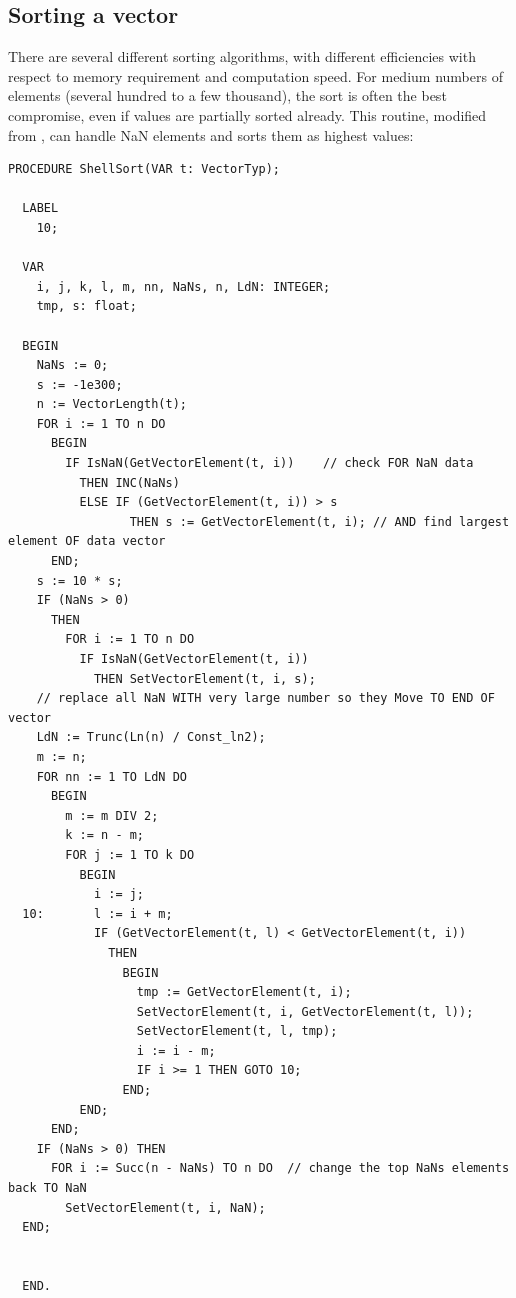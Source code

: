 \begin{refsection}
\section{Sorting a vector}\label{text:sort}

There are several different sorting algorithms, with different efficiencies with respect to memory requirement and computation speed. For medium numbers of elements (several hundred to a few thousand), the  sort is often the best compromise, even if values are partially sorted already. This routine, modified from \parencite{Mor-13}, can handle \acs{NaN} elements and sorts them as highest values:
\begin{lstlisting}[caption=Shell sort]
  PROCEDURE ShellSort(VAR t: VectorTyp);

  LABEL
    10;

  VAR
    i, j, k, l, m, nn, NaNs, n, LdN: INTEGER;
    tmp, s: float;

  BEGIN
    NaNs := 0;
    s := -1e300;
    n := VectorLength(t);
    FOR i := 1 TO n DO
      BEGIN
        IF IsNaN(GetVectorElement(t, i))    // check FOR NaN data
          THEN INC(NaNs)
          ELSE IF (GetVectorElement(t, i)) > s
                 THEN s := GetVectorElement(t, i); // AND find largest element OF data vector
      END;
    s := 10 * s;
    IF (NaNs > 0)
      THEN
        FOR i := 1 TO n DO
          IF IsNaN(GetVectorElement(t, i))
            THEN SetVectorElement(t, i, s);
    // replace all NaN WITH very large number so they Move TO END OF vector
    LdN := Trunc(Ln(n) / Const_ln2);
    m := n;
    FOR nn := 1 TO LdN DO
      BEGIN
        m := m DIV 2;
        k := n - m;
        FOR j := 1 TO k DO
          BEGIN
            i := j;
  10:       l := i + m;
            IF (GetVectorElement(t, l) < GetVectorElement(t, i))
              THEN
                BEGIN
                  tmp := GetVectorElement(t, i);
                  SetVectorElement(t, i, GetVectorElement(t, l));
                  SetVectorElement(t, l, tmp);
                  i := i - m;
                  IF i >= 1 THEN GOTO 10;
                END;
          END;
      END;
    IF (NaNs > 0) THEN
      FOR i := Succ(n - NaNs) TO n DO  // change the top NaNs elements back TO NaN
        SetVectorElement(t, i, NaN);
  END;


  END.
\end{lstlisting}

\printbibliography[heading=subbibliography]
\end{refsection}

